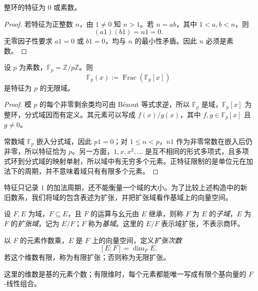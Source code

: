 \documentclass[lang=cn,a4paper,fontset=none,zihao=false,10pt,openany,twoside]{beautybook}
\numberwithin{algorithm}{chapter}
\begin{document}
\Needspace{50mm}
\begin{proposition}[整环的特征]
整环的特征为 $0$ 或素数。
\end{proposition}
\begin{proof}
若特征为正整数 $n$，由 $1\ne0$ 知 $n>1$。若 $n=ab$，其中 $1<a,b<n$，则
\[
 (a1)(b1)=n1=0.
\]
无零因子性要求 $a1=0$ 或 $b1=0$，均与 $n$ 的最小性矛盾。因此 $n$ 必须是素数。
\end{proof}
\begin{example}[正特征的无限域]
设 $p$ 为素数，$\mathbb F_p=\mathbb Z/p\mathbb Z$。则
\[
 \mathbb F_p(x):=\operatorname{Frac}(\mathbb F_p[x])
\]
是特征为 $p$ 的无限域。
\end{example}
\begin{proof}
模 $p$ 的每个非零剩余类均可由 B\'ezout 等式求逆，所以 $\mathbb F_p$ 是域，$\mathbb F_p[x]$ 为整环，分式域因而有定义。其元素可以写成 $f(x)/g(x)$，其中 $f,g\in\mathbb F_p[x]$ 且 $g\ne0$。

常数域 $\mathbb F_p$ 嵌入分式域，因此 $p1=0$；对 $1\le n<p$，$n1$ 作为非零常数在嵌入后仍非零，所以特征恰为 $p$。另一方面，$1,x,x^2,\ldots$ 是互不相同的形式多项式，且多项式环到分式域的映射单射，所以域中有无穷多个元素。正特征限制的是单位元在加法下的周期，并不意味着域只有有限多个元素。
\end{proof}

特征只记录 $1$ 的加法周期，还不能衡量一个域的大小。为了比较上述构造中的新旧数系，我们将域的包含表述为扩张，并把扩张域看作基域上的向量空间。
\begin{definition}[域扩张与扩张次数]
设 $F,E$ 为域，$F\subseteq E$，且 $F$ 的运算与幺元由 $E$ 继承，则称 $F$ 为 $E$ 的\emph{子域}，$E$ 为 $F$ 的\emph{扩张域}，记为 $E/F$；$F$ 称为\emph{基域}。这里的 $E/F$ 表示域扩张，不表示商环。

以 $F$ 的元素作数乘，$E$ 是 $F$ 上的向量空间，定义\emph{扩张次数}
\[
 [E:F]=\dim_F E.
\]
若这个维数有限，称为有限扩张；否则称为无限扩张。
\end{definition}
这里的维数是基的元素个数；有限维时，每个元素都能唯一写成有限个基向量的 $F$-线性组合。
\end{document}
